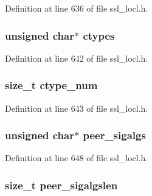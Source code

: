 Definition at line 636 of file ssl\+\_\+locl.\+h.

\subsubsection[{\texorpdfstring{ctypes}{ctypes}}]{\setlength{\rightskip}{0pt plus 5cm}unsigned char$\ast$ ctypes}\hypertarget{structcert__st_af28330052a1b8771bd6ef6a04ebab278}{}\label{structcert__st_af28330052a1b8771bd6ef6a04ebab278}


Definition at line 642 of file ssl\+\_\+locl.\+h.

\subsubsection[{\texorpdfstring{ctype\+\_\+num}{ctype_num}}]{\setlength{\rightskip}{0pt plus 5cm}size\+\_\+t ctype\+\_\+num}\hypertarget{structcert__st_a897c085994e528f991829c3f2ac83202}{}\label{structcert__st_a897c085994e528f991829c3f2ac83202}


Definition at line 643 of file ssl\+\_\+locl.\+h.

\subsubsection[{\texorpdfstring{peer\+\_\+sigalgs}{peer_sigalgs}}]{\setlength{\rightskip}{0pt plus 5cm}unsigned char$\ast$ peer\+\_\+sigalgs}\hypertarget{structcert__st_a86160776fd90a85e91a135bd433e4f98}{}\label{structcert__st_a86160776fd90a85e91a135bd433e4f98}


Definition at line 648 of file ssl\+\_\+locl.\+h.

\subsubsection[{\texorpdfstring{peer\+\_\+sigalgslen}{peer_sigalgslen}}]{\setlength{\rightskip}{0pt plus 5cm}size\+\_\+t peer\+\_\+sigalgslen}\hypertarget{structcert__st_a4e99a4ef3e1cdc12cc5d82e8f4db626f}{}\label{structcert__st_a4e99a4ef3e1cdc12cc5d82e8f4db626f}


